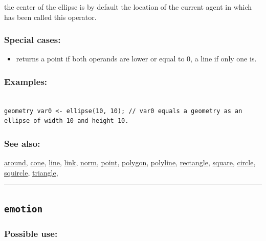 \documentclass[]{book}
\providecommand{\tightlist}{%
  \setlength{\itemsep}{0pt}\setlength{\parskip}{0pt}}
\theoremstyle{definition}
\theoremstyle{definition}
\theoremstyle{definition}
\theoremstyle{remark}
\begin{document}
the center of the ellipse is by default the location of the current
agent in which has been called this operator.

\subsubsection{Special cases:}\label{special-cases-54}

\begin{itemize}
\tightlist
\item
  returns a point if both operands are lower or equal to 0, a line if
  only one is.
\end{itemize}

\subsubsection{Examples:}\label{examples-113}

\begin{verbatim}
 
geometry var0 <- ellipse(10, 10); // var0 equals a geometry as an ellipse of width 10 and height 10.
\end{verbatim}

\subsubsection{See also:}\label{see-also-87}

\href{operators-a-to-a.html\#around}{around},
\href{operators-b-to-c.html\#cone}{cone},
\href{operators-i-to-m.html\#line}{line},
\href{operators-i-to-m.html\#link}{link},
\href{operators-n-to-r.html\#norm}{norm},
\href{operators-n-to-r.html\#point}{point},
\href{operators-n-to-r.html\#polygon}{polygon},
\href{operators-n-to-r.html\#polyline}{polyline},
\href{operators-n-to-r.html\#rectangle}{rectangle},
\href{operators-s-to-z.html\#square}{square},
\href{operators-b-to-c.html\#circle}{circle},
\href{operators-s-to-z.html\#squircle}{squircle},
\href{operators-s-to-z.html\#triangle}{triangle},

\begin{center}\rule{0.5\linewidth}{\linethickness}\end{center}

\subsection{\texorpdfstring{\texttt{emotion}}{emotion}}\label{emotion}

\subsubsection{Possible use:}\label{possible-use-151}
\end{document}
